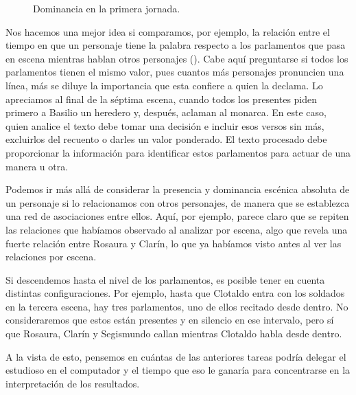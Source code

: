 \begin{figure}[!ht]
	\centering\small
	
	\caption{Dominancia en la primera jornada.}
	\label{fig:dramados}
\end{figure}

Nos hacemos una mejor idea si comparamos, por ejemplo, la relación entre el tiempo en que un personaje tiene la palabra respecto a los parlamentos que pasa en escena mientras hablan otros personajes (). Cabe aquí preguntarse si todos los parlamentos tienen el mismo valor, pues cuantos más personajes pronuncien una línea, más se diluye la importancia que esta confiere a quien la declama. Lo apreciamos al final de la séptima escena, cuando todos los presentes piden primero a Basilio un heredero y, después, aclaman al monarca. En este caso, quien analice el texto debe tomar una decisión e incluir esos versos sin más, excluirlos del recuento o darles un valor ponderado. El texto procesado debe proporcionar la información para identificar estos parlamentos para actuar de una manera u otra.

Podemos ir más allá de considerar la presencia y dominancia escénica absoluta de un personaje si lo relacionamos con otros personajes, de manera que se establezca una red de asociaciones entre ellos. Aquí, por ejemplo, parece claro que se repiten las relaciones que habíamos observado al analizar por escena, algo que revela una fuerte relación entre Rosaura y Clarín, lo que ya habíamos visto antes al ver las relaciones por escena. 



Si descendemos hasta el nivel de los parlamentos, es posible tener en cuenta distintas configuraciones. Por ejemplo, hasta que Clotaldo entra con los soldados en la tercera escena, hay tres parlamentos, uno de ellos recitado desde dentro. No consideraremos que estos están presentes y en silencio en ese intervalo, pero sí que Rosaura, Clarín y Segismundo callan mientras Clotaldo habla desde dentro.

A la vista de esto, pensemos en cuántas de las anteriores tareas podría delegar el estudioso en el computador y el tiempo que eso le ganaría para concentrarse en la interpretación de los resultados.
